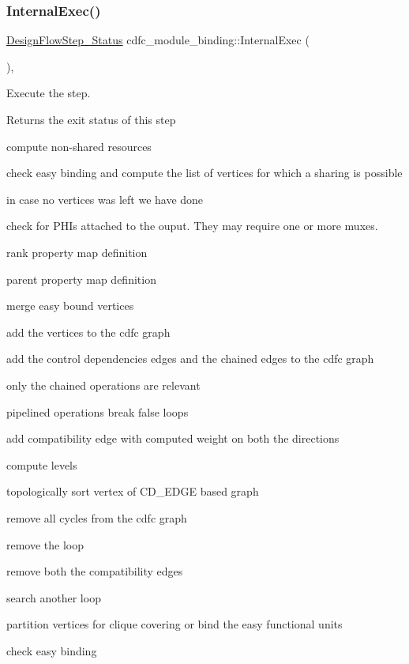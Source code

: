 \subsubsection{\texorpdfstring{Internal\+Exec()}{InternalExec()}}
{\footnotesize\ttfamily \hyperlink{design__flow__step_8hpp_afb1f0d73069c26076b8d31dbc8ebecdf}{Design\+Flow\+Step\+\_\+\+Status} cdfc\+\_\+module\+\_\+binding\+::\+Internal\+Exec (\begin{DoxyParamCaption}{ }\end{DoxyParamCaption})\hspace{0.3cm}{\ttfamily [override]}, {\ttfamily [virtual]}}



Execute the step. 

\begin{DoxyReturn}{Returns}
the exit status of this step 
\end{DoxyReturn}
compute non-\/shared resources

check easy binding and compute the list of vertices for which a sharing is possible

in case no vertices was left we have done

check for P\+H\+Is attached to the ouput. They may require one or more muxes.

rank property map definition

parent property map definition

merge easy bound vertices

add the vertices to the cdfc graph

add the control dependencies edges and the chained edges to the cdfc graph

only the chained operations are relevant

pipelined operations break false loops

add compatibility edge with computed weight on both the directions

compute levels

topologically sort vertex of C\+D\+\_\+\+E\+D\+GE based graph

remove all cycles from the cdfc graph

remove the loop

remove both the compatibility edges

search another loop

partition vertices for clique covering or bind the easy functional units

check easy binding

